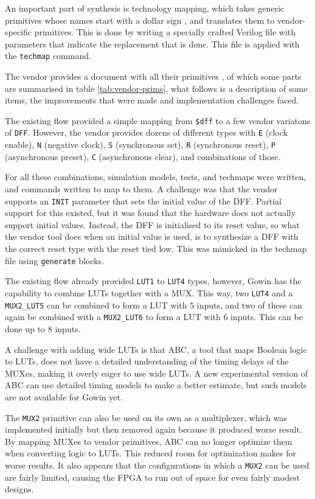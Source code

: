 \documentclass{article}
\begin{document}
An important part of synthesis is technology mapping, which takes generic primitives whose names start with a dollar sign \cite{yosysman}, and translates them to vendor-specific primitives. This is done by writing a specially crafted Verilog file with parameters that indicate the replacement that is done. This file is applied with the \texttt{techmap} command.

The vendor provides a document with all their primitives \cite{gowinprim}, of which some parts are summarised in table \ref{tab:vendor-prims}, what follows is a description of some items, the improvements that were made and implementation challenges faced.

The existing flow provided a simple mapping from \texttt{\$dff} to a few vendor variatons of \texttt{DFF}. However, the vendor provides dozens of different types with \texttt{E} (clock enable), \texttt{N} (negative clock), \texttt{S} (synchronous set), \texttt{R} (synchronous reset), \texttt{P} (asynchronous preset), \texttt{C} (asynchronous clear), and combinations of those.

For all these combinations, simulation models, tests, and techmaps were written, and commands written to map to them. A challenge was that the vendor supports an \texttt{INIT} parameter that sets the initial value of the DFF. Partial support for this existed, but it was found that the hardware does not actually support initial values. Instead, the DFF is initialised to its reset value, so what the vendor tool does when an initial value is used, is to synthesize a DFF with the correct reset type with the reset tied low. This was mimicked in the techmap file using \texttt{generate} blocks.

The existing flow already provided \texttt{LUT1} to \texttt{LUT4} types, however, Gowin has the capability to combine LUTs together with a MUX. This way, two \texttt{LUT4} and a \texttt{MUX2\_LUT5} can be combined to form a LUT with 5 inputs, and two of these can again be combined with a \texttt{MUX2\_LUT6} to form a LUT with 6 inputs. This can be done up to 8 inputs.

A challenge with adding wide LUTs is that ABC, a tool that maps Boolean logic to LUTs, does not have a detailed understanding of the timing delays of the MUXes, making it overly eager to use wide LUTs. A new experimental version of ABC can use detailed timing models to make a better estimate, but such models are not available for Gowin yet.

The \texttt{MUX2} primitive can also be used on its own as a multiplexer, which was implemented initially but then removed again because it produced worse result. By mapping MUXes to vendor primitives, ABC can no longer optimize them when converting logic to LUTs. This reduced room for optimization makes for worse results. It also appears that the configurations in which a \texttt{MUX2} can be used are fairly limited, causing the FPGA to run out of space for even fairly modest designs.
\end{document}
